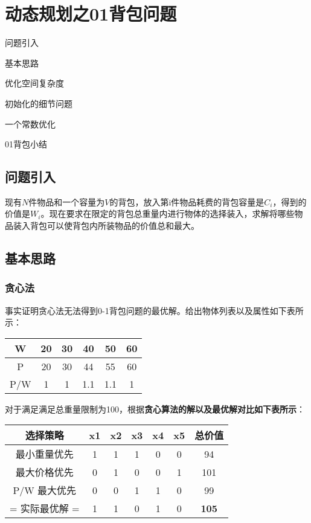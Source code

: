 \chapter{动态规划之01背包问题}

\begin{introduction}
	\item 问题引入
	\item 基本思路
	\item 优化空间复杂度
	\item 初始化的细节问题
	\item 一个常数优化
	\item 01背包小结
\end{introduction}

\section{问题引入}
现有$N$件物品和一个容量为$V$的背包，放入第i件物品耗费的背包容量是$C_i$，得到的价值是$W_i$。现在要求在限定的背包总重量内进行物体的选择装入，求解将哪些物品装入背包可以使背包内所装物品的价值总和最大。
\section{基本思路}

\subsection{贪心法}
事实证明贪心法无法得到0-1背包问题的最优解。给出物体列表以及属性如下表所示：

\begin{center}
\begin{tabular}{cccccc}
\toprule  %
W& 20& 30& 40& 50& 60\\
\midrule  %
P& 20& 30& 44& 55& 60\\
P/W& 1& 1& 1.1& 1.1& 1\\
\bottomrule %
\end{tabular}
\end{center}

对于满足满足总重量限制为100，根据\textbf{贪心算法的解以及最优解对比如下表所示}：

\begin{center}
\begin{tabular}{ccccccc}
\toprule  %
选择策略& x1& x2& x3& x4& x5& 总价值\\
\midrule  %
最小重量优先& 1& 1& 1& 0& 0& 94\\
最大价格优先& 0& 1& 0& 0& 1& 101\\
P/W 最大优先& 0& 0& 1& 1& 0& 99\\
= 实际最优解 =& 1& 1& 0& 1& 0& \textbf{105}\\ 
\bottomrule %
\end{tabular}
\end{center}

